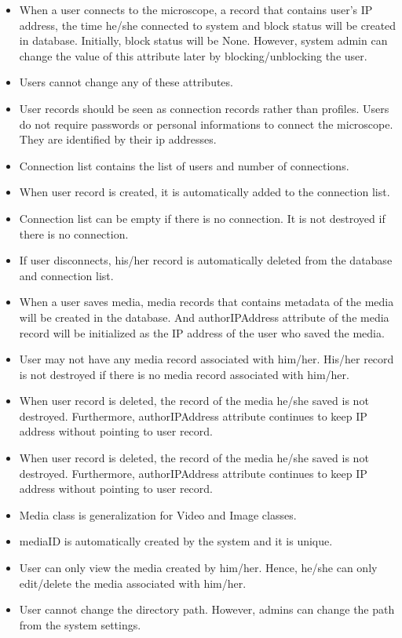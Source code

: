 \begin{itemize}
	\item When a user connects to the microscope, a record that contains user's IP address, the time he/she connected to system and block status will be created in database. Initially, block status will be None. However, system admin can change the value of this attribute later by blocking/unblocking the user.
	\item Users cannot change any of these attributes.
	\item User records should be seen as connection records rather than profiles. Users do not require passwords or personal informations to connect the microscope. They are identified by their ip addresses.
	\item Connection list contains the list of users and number of connections.
	\item When user record is created, it is automatically added to the connection list.
	\item Connection list can be empty if there is no connection. It is not destroyed if there is no connection.
	\item If user disconnects, his/her record is automatically deleted from the database and connection list.
	\item When a user saves media, media records that contains metadata of the media will be created in the database. And authorIPAddress attribute of the media record will be initialized as the IP address of the user who saved the media.
	\item User may not have any media record associated with him/her. His/her record is not destroyed if there is no media record associated with him/her.
	\item When user record is deleted, the record of the media he/she saved is not destroyed. Furthermore, authorIPAddress attribute continues to keep IP address without pointing to user record.
	\item When user record is deleted, the record of the media he/she saved is not destroyed. Furthermore, authorIPAddress attribute continues to keep IP address without pointing to user record.
	\item Media class is generalization for Video and Image classes.
	\item mediaID is automatically created by the system and it is unique.
	\item User can only view the media created by him/her. Hence, he/she can only edit/delete the media associated with him/her.
	\item User cannot change the directory path. However, admins can change the path from the system settings.

\end{itemize}
